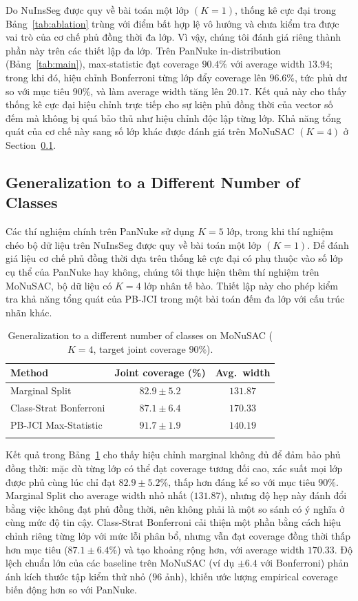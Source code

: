 \documentclass[pdflatex,sn-mathphys-num]{sn-jnl}
\begin{document}
Do NuInsSeg được quy về bài toán một lớp \((K=1)\), thống kê cực đại trong
Bảng~\ref{tab:ablation} trùng với điểm bất hợp lệ vô hướng và chưa kiểm tra được vai
trò của cơ chế phủ đồng thời đa lớp. Vì vậy, chúng tôi đánh giá riêng thành phần này
trên các thiết lập đa lớp. Trên PanNuke in-distribution (Bảng~\ref{tab:main}),
max-statistic đạt coverage $90.4\%$ với average width $13.94$; trong khi đó, hiệu chỉnh Bonferroni từng lớp
đẩy coverage lên $96.6\%$, tức phủ dư so với mục tiêu $90\%$, và làm average width
tăng lên $20.17$. Kết quả này cho thấy thống kê cực đại hiệu chỉnh trực tiếp cho sự
kiện phủ đồng thời của vector số đếm mà không bị quá bảo thủ như hiệu chỉnh độc lập
từng lớp. Khả năng tổng quát của cơ chế này sang số lớp khác được đánh giá trên
MoNuSAC \((K=4)\) ở Section~\ref{sec:monusac}.

\subsection{Generalization to a Different Number of Classes}\label{sec:monusac}

Các thí nghiệm chính trên PanNuke sử dụng \(K=5\) lớp, trong khi thí nghiệm chéo bộ
dữ liệu trên NuInsSeg được quy về bài toán một lớp \((K=1)\). Để đánh giá liệu cơ chế
phủ đồng thời dựa trên thống kê cực đại có phụ thuộc vào số lớp cụ thể của PanNuke hay
không, chúng tôi thực hiện thêm thí nghiệm trên MoNuSAC, bộ dữ liệu có \(K=4\) lớp
nhân tế bào. Thiết lập này cho phép kiểm tra khả năng tổng quát của PB-JCI trong một
bài toán đếm đa lớp với cấu trúc nhãn khác.

\begin{table}[t]
\caption{Generalization to a different number of classes on MoNuSAC (\(K=4\), target
joint coverage \(90\%\)).}
\label{tab:monusac}
\centering
\begin{tabular}{@{}lcc@{}}
\toprule
Method & Joint coverage (\%) & Avg.\ width \\
\midrule
Marginal Split & $82.9\pm5.2$ & $131.87$ \\
Class-Strat Bonferroni & $87.1\pm6.4$ & $170.33$ \\
PB-JCI Max-Statistic & $\mathbf{91.7\pm1.9}$ & $140.19$ \\
\botrule
\end{tabular}
\end{table}

Kết quả trong Bảng~\ref{tab:monusac} cho thấy hiệu chỉnh marginal không đủ để đảm bảo
phủ đồng thời: mặc dù từng lớp có thể đạt coverage tương đối cao, xác suất mọi lớp
được phủ cùng lúc chỉ đạt $82.9\pm5.2\%$, thấp hơn đáng kể so với mục tiêu \(90\%\).
Marginal Split cho average width nhỏ nhất ($131.87$), nhưng độ hẹp này đánh đổi bằng
việc không đạt phủ đồng thời, nên không phải là một so sánh có ý nghĩa ở cùng mức
độ tin cậy.
Class-Strat Bonferroni cải thiện một phần bằng cách hiệu chỉnh riêng từng lớp với mức
lỗi phân bổ, nhưng vẫn đạt coverage đồng thời thấp hơn mục tiêu
($87.1\pm6.4\%$) và tạo khoảng rộng hơn, với average width $170.33$. Độ lệch chuẩn lớn
của các baseline trên MoNuSAC (ví dụ $\pm6.4$ với Bonferroni) phản ánh kích thước tập
kiểm thử nhỏ ($96$ ảnh), khiến ước lượng empirical coverage biến động hơn so với
PanNuke.
\end{document}
